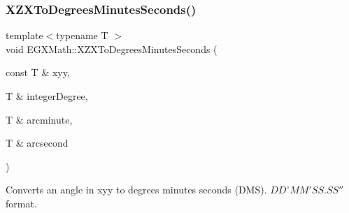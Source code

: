 \subsubsection{\texorpdfstring{X\+Z\+X\+To\+Degrees\+Minutes\+Seconds()}{XZXToDegreesMinutesSeconds()}}
{\footnotesize\ttfamily template$<$typename T $>$ \\
void E\+G\+X\+Math\+::\+X\+Z\+X\+To\+Degrees\+Minutes\+Seconds (\begin{DoxyParamCaption}\item[{const T \&}]{xyy,  }\item[{T \&}]{integer\+Degree,  }\item[{T \&}]{arcminute,  }\item[{T \&}]{arcsecond }\end{DoxyParamCaption})}



Converts an angle in xyy to degrees minutes seconds (D\+MS). ${DD}^{\circ}{MM}'{SS.SS}''$ format. 


